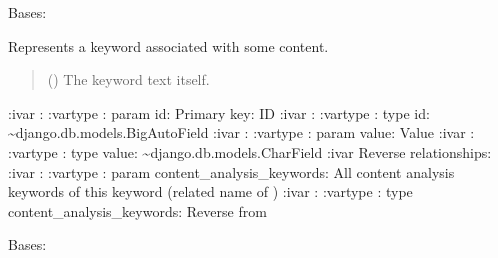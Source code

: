 \documentclass[letterpaper,10pt,english]{sphinxmanual}
\begin{document}
\begin{fulllineitems}
\label{\detokenize{source/meta_models_management:meta_models_management.models.Keyword}}
\pysigstartsignatures
{}
\pysigstopsignatures
\sphinxAtStartPar
Bases: 

\sphinxAtStartPar
Represents a keyword associated with some content.
\begin{quote}\begin{description}
\sphinxAtStartPar
{} () \textendash{} The keyword text itself.

\end{description}\end{quote}

\sphinxAtStartPar
:ivar : 
:vartype : param id: Primary key: ID
:ivar : 
:vartype : type id: \textasciitilde{}django.db.models.BigAutoField
:ivar : 
:vartype : param value: Value
:ivar :
:vartype : type value: \textasciitilde{}django.db.models.CharField
:ivar Reverse relationships:
:ivar : 
:vartype : param content\_analysis\_keywords: All content analysis keywords of this keyword (related name of )
:ivar : 
:vartype : type content\_analysis\_keywords: Reverse  from {\hyperref[\detokenize{source/meta_models_management:meta_models_management.models.ContentAnalysis}]{}}

\begin{fulllineitems}
\label{\detokenize{source/meta_models_management:meta_models_management.models.Keyword.DoesNotExist}}
\pysigstartsignatures
{}
\pysigstopsignatures
\sphinxAtStartPar
Bases: 


\end{fulllineitems}
\end{fulllineitems}
\end{document}
